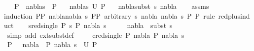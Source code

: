 \begin{isabellebody}
\ \ \ {\isachardoublequoteopen}P{}\ {\isasymTurnstile}\ {\isacharparenleft}{\kern0pt}nabla{\isacharcomma}{\kern0pt}s{\isacharparenright}{\kern0pt}\ {\isasymRightarrow}\ P{}{\isachardoublequoteclose}\isanewline
\ \ \ {\isachardoublequoteopen}{\isacharparenleft}{\kern0pt}nabla{}{\isacharcomma}{\kern0pt}s{}{\isacharparenright}{\kern0pt}{\isasymin}\ U\ P{}{\isachardoublequoteclose}\isanewline
\ \ \ {\isachardoublequoteopen}nabla{}{\isasymTurnstile}{\isacharparenleft}{\kern0pt}subst\ s{}{\isacharparenright}{\kern0pt}\ nabla{\isachardoublequoteclose}\isanewline
%
\isadelimproof
\ \ %
\endisadelimproof
%
\isatagproof
{}\isamarkupfalse%
\ assms\isanewline
{}\isamarkupfalse%
{\isacharparenleft}{\kern0pt}induction\ P{}{\isasymequiv}{\isachardoublequoteopen}P{}{\isachardoublequoteclose}\ nabla{\isasymequiv}{\isachardoublequoteopen}{\isacharparenleft}{\kern0pt}nabla{\isacharcomma}{\kern0pt}\ s{\isacharparenright}{\kern0pt}{\isachardoublequoteclose}\ P{}{\isasymequiv}{\isachardoublequoteopen}P{}{\isachardoublequoteclose}\ arbitrary{\isacharcolon}{\kern0pt}\ s\ nabla{}\ nabla\ s{}\ P{}\ P{}\ rule{\isacharcolon}{\kern0pt}\ red{\isacharunderscore}{\kern0pt}plus{\isachardot}{\kern0pt}induct{\isacharparenright}{\kern0pt}\isanewline
\ \ \isamarkupfalse%
\ {\isacharparenleft}{\kern0pt}sred{\isacharunderscore}{\kern0pt}single\ P{}\ s\ P{}\ nabla{}\ s{}{\isacharparenright}{\kern0pt}\isanewline
\ \ \isamarkupfalse%
\ \isamarkupfalse%
\ {\isachardoublequoteopen}nabla{}\ {\isasymTurnstile}\ {\isacharparenleft}{\kern0pt}subst\ s{}{\isacharparenright}{\kern0pt}\ {\isacharbraceleft}{\kern0pt}{\isacharbraceright}{\kern0pt}{\isachardoublequoteclose}\ \isamarkupfalse%
\ {\isacharparenleft}{\kern0pt}simp\ add{\isacharcolon}{\kern0pt}\ ext{\isacharunderscore}{\kern0pt}subst{\isacharunderscore}{\kern0pt}def{\isacharparenright}{\kern0pt}\ \isanewline
{}\isamarkupfalse%
\isanewline
\ \ \isamarkupfalse%
\ {\isacharparenleft}{\kern0pt}cred{\isacharunderscore}{\kern0pt}single\ P{}\ nabla{}\ P{}\ nabla{}\ s{}{\isacharparenright}{\kern0pt}\isanewline
\ \ \isamarkupfalse%
\ {\isachardoublequoteopen}P{}\ \ {\isasymturnstile}\ nabla{}\ {\isasymrightarrow}\ P{}{\isachardoublequoteclose}\ {\isachardoublequoteopen}{\isacharparenleft}{\kern0pt}nabla{}{\isacharcomma}{\kern0pt}\ s{}{\isacharparenright}{\kern0pt}\ {\isasymin}\ U\ P{}{\isachardoublequoteclose}\ \isamarkupfalse%

\end{isabellebody}
